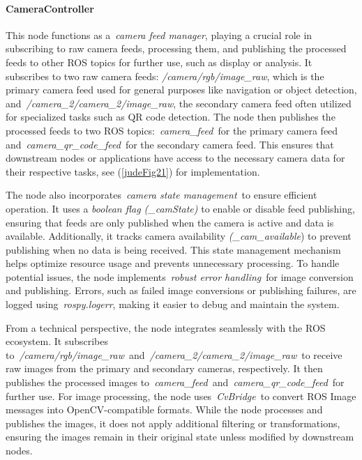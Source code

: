 \documentclass[../../main]{subfiles}
\begin{document}
\paragraph{CameraController}

This node functions as a~\emph{camera feed manager}, playing a crucial
role in subscribing to raw camera feeds, processing them, and publishing
the processed feeds to other ROS topics for further use, such as display
or analysis. It subscribes to two raw camera
feeds: \emph{/camera/rgb/image\_raw}, which is the primary camera feed
used for general purposes like navigation or object detection,
and~\emph{/camera\_2/camera\_2/image\_raw}, the secondary camera feed
often utilized for specialized tasks such as QR code detection. The node
then publishes the processed feeds to two ROS
topics:~\emph{camera\_feed}~for the primary camera feed
and~\emph{camera\_qr\_code\_feed}~for the secondary camera feed. This
ensures that downstream nodes or applications have access to the
necessary camera data for their respective tasks, see (\cref{judeFig21}) for
implementation.

The node also incorporates~\emph{camera state management}~to ensure
efficient operation. It uses a \emph{boolean flag (\_camState)} to
enable or disable feed publishing, ensuring that feeds are only
published when the camera is active and data is available. Additionally,
it tracks camera availability \emph{(\_cam\_available}) to prevent
publishing when no data is being received. This state management
mechanism helps optimize resource usage and prevents unnecessary
processing. To handle potential issues, the node implements~\emph{robust
error handling}~for image conversion and publishing. Errors, such as
failed image conversions or publishing failures, are logged
using~\emph{rospy.logerr}, making it easier to debug and maintain the
system.

From a technical perspective, the node integrates seamlessly with the
ROS ecosystem. It subscribes
to~\emph{/camera/rgb/image\_raw}~and~\emph{/camera\_2/camera\_2/image\_raw}~to
receive raw images from the primary and secondary cameras, respectively.
It then publishes the processed images
to~\emph{camera\_feed~}and\emph{~camera\_qr\_code\_feed}~for further
use. For image processing, the node uses~\emph{CvBridge}~to convert ROS
Image messages into OpenCV-compatible formats. While the node processes
and publishes the images, it does not apply additional filtering or
transformations, ensuring the images remain in their original state
unless modified by downstream nodes.
\end{document}

